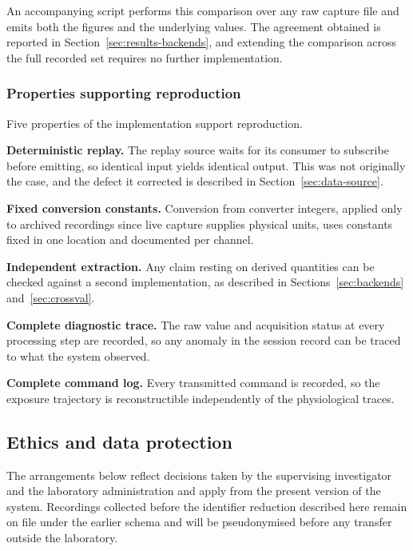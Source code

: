 An accompanying script performs this comparison over any raw
capture file and emits both the figures and the underlying values.
The agreement obtained is reported in
Section~\ref{sec:results-backends}, and extending the comparison
across the full recorded set requires no further implementation.

\subsubsection{Properties supporting reproduction}

Five properties of the implementation support reproduction.

\textbf{Deterministic replay.} The replay source waits for its
consumer to subscribe before emitting, so identical input yields
identical output. This was not originally the case, and
the defect it corrected is described in
Section~\ref{sec:data-source}.

\textbf{Fixed conversion constants.} Conversion from converter
integers, applied only to archived recordings since live capture
supplies physical units, uses constants fixed in one location and
documented per channel.

\textbf{Independent extraction.} Any claim resting on derived
quantities can be checked against a second implementation, as
described in Sections~\ref{sec:backends} and~\ref{sec:crossval}.

\textbf{Complete diagnostic trace.} The raw value and acquisition
status at every processing step are recorded, so any anomaly in
the session record can be traced to what the system observed.

\textbf{Complete command log.} Every transmitted command is
recorded, so the exposure trajectory is reconstructible
independently of the physiological traces.

\subsection{Ethics and data protection}
\label{sec:ethics}

The arrangements below reflect decisions taken by the supervising
investigator and the laboratory administration and apply from the
present version of the system. Recordings collected before the
identifier reduction described here remain on file under the
earlier schema and will be pseudonymised before any transfer
outside the laboratory.

